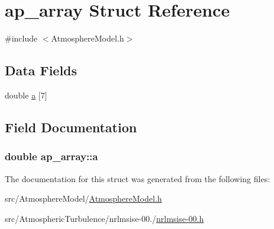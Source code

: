 \hypertarget{structap__array}{\section{ap\+\_\+array Struct Reference}
\label{structap__array}
}


{\ttfamily \#include $<$Atmosphere\+Model.\+h$>$}

\subsection*{Data Fields}
\begin{DoxyCompactItemize}
\item 
double \hyperlink{structap__array_ac8261eba1b3ae612e2361a0979eab92b}{a} \mbox{[}7\mbox{]}
\end{DoxyCompactItemize}


\subsection{Field Documentation}
\hypertarget{structap__array_ac8261eba1b3ae612e2361a0979eab92b}{
\subsubsection[{a}]{\setlength{\rightskip}{0pt plus 5cm}double ap\+\_\+array\+::a}}\label{structap__array_ac8261eba1b3ae612e2361a0979eab92b}


The documentation for this struct was generated from the following files\+:\begin{DoxyCompactItemize}
\item 
src/\+Atmosphere\+Model/\hyperlink{AtmosphereModel_8h}{Atmosphere\+Model.\+h}\item 
src/\+Atmospheric\+Turbulence/nrlmsise-\/00./\hyperlink{nrlmsise-00_8h}{nrlmsise-\/00.\+h}\end{DoxyCompactItemize}
